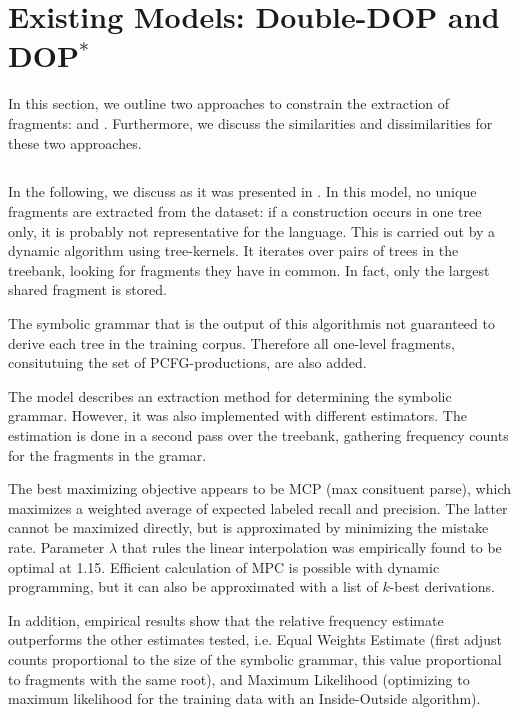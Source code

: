
\section{Existing Models: Double-DOP and DOP$^*$}\label{sec:Existing}


In this section, we outline two approaches to constrain the extraction of fragments: \ddop{} and \dops{}. Furthermore, we discuss the similarities and dissimilarities for these two approaches. 

\subsection{\ddop}
In the following, we discuss \ddop{} as it was presented in \cite{sangati2011}. In this model, no unique fragments are extracted from the dataset: if a construction occurs in one tree only, it is probably not representative for the language. This is carried out by a dynamic algorithm using tree-kernels. It iterates over pairs of trees in the treebank, looking for fragments they have in common. In fact, only the largest shared fragment is stored. 

The symbolic grammar that is the output of this algorithmis not guaranteed to derive each tree in the training corpus. Therefore all one-level fragments, consitutuing the set of PCFG-productions, are also added.

The \ddop{} model describes an extraction method for determining the symbolic grammar. However, it was also implemented with different estimators. The estimation is done in a second pass over the treebank, gathering frequency counts for the fragments in the gramar. 

The best maximizing objective appears to be MCP (max consituent parse), which maximizes a weighted average of expected labeled recall and precision. The latter cannot be maximized directly, but is approximated by minimizing the mistake rate. 
Parameter $\lambda$ that rules the linear interpolation was empirically found to be optimal at 1.15. Efficient calculation of MPC is possible with dynamic programming, but it can also be approximated with a list of $k$-best derivations.

In addition, empirical results show that the relative frequency estimate outperforms the other estimates tested, i.e. Equal Weights Estimate (first adjust counts proportional to the size of the symbolic grammar, this value proportional to fragments with the same root), and Maximum Likelihood (optimizing to maximum likelihood for the training data with an Inside-Outside algorithm). 

